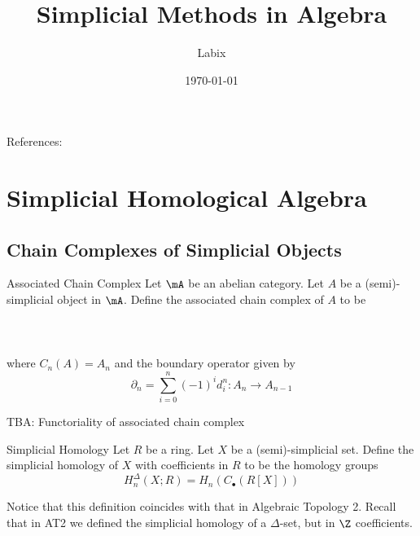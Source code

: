 \documentclass[a4paper]{article}
\title{Simplicial Methods in Algebra}
\author{Labix}
\date{\today}
\begin{document}
\maketitle
\begin{abstract}

\end{abstract}
References: 

\pagebreak
\tableofcontents

\pagebreak
\section{Simplicial Homological Algebra}
\subsection{Chain Complexes of Simplicial Objects}
\begin{defn}{Associated Chain Complex}{} Let $\mA$ be an abelian category. Let $A$ be a (semi)-simplicial object in $\mA$. Define the associated chain complex of $A$ to be \\~\\
\\~\\
where $C_n(A)=A_n$ and the boundary operator given by $$\partial_n=\sum_{i=0}^n(-1)^id_i^n:A_n\to A_{n-1}$$
\end{defn}

TBA: Functoriality of associated chain complex

\begin{defn}{Simplicial Homology}{} Let $R$ be a ring. Let $X$ be a (semi)-simplicial set. Define the simplicial homology of $X$ with coefficients in $R$ to be the homology groups $$H_n^\Delta(X;R)=H_n(C_\bullet(R[X]))$$
\end{defn}

Notice that this definition coincides with that in Algebraic Topology 2. Recall that in AT2 we defined the simplicial homology of a $\Delta$-set, but in $\Z$ coefficients. 
\end{document}
